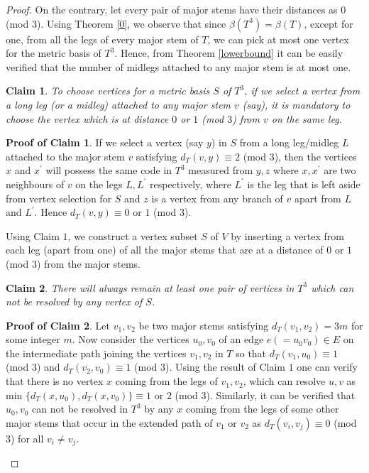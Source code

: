 \documentclass{article}
\theoremstyle{definition}
\numberwithin{equation}{section}
\newtheorem{claim}{Claim}
\newtheorem{claimproof}{Proof of Claim}
\begin{document}
\begin{proof}
On the contrary, let every pair of major stems have their distances as $0$ (mod $3$). Using Theorem \ref{0}, we observe that since $\beta{(T^{3})}=\beta{(T)}$, except for one, from all the legs of every major stem of $T$, we can pick at most one vertex for the metric basis of $T^{3}$.
Hence, from Theorem \ref{lowerbound} it can be easily verified that the number of midlegs attached to any major stem is at most one.

\vspace{0.3em}
\begin{claim}
\textit{To choose vertices for a metric basis $S$ of $T^{3}$, if we select a vertex from a long leg (or a midleg)  attached to any major stem $v$ (say), it is mandatory to choose the vertex which is at distance $0$ or $1$ (mod $3$) from $v$ on the same leg.} 
\end{claim}
\vspace{0.3em}


\begin{claimproof}
If we select a vertex (say $y$) in $S$ from a long leg/midleg $L$ attached to the major stem $v$ satisfying $d_{T}(v,y)\equiv 2$ (mod $3$), then the vertices $x$ and $x^{\prime}$ will possess the same code in $T^{3}$ measured from $y,z$ where $x,x^{\prime}$ are two neighbours of $v$ on the legs $L, L^{\prime}$ respectively, where $L^{\prime}$ is the leg that is left aside from vertex selection for $S$ and $z$ is a vertex from any branch of $v$ apart from $L$ and $L^{\prime}$. Hence $d_{T}(v,y)\equiv 0$ or $1$ (mod $3$).
\end{claimproof}

Using Claim $1$, we construct a vertex subset $S$ of $V$ by inserting a vertex from each leg (apart from one) of all the major stems that are at a distance of $0$ or $1$ (mod $3$) from the major stems.

\vspace{0.3em}
\begin{claim} \textit{There will always remain at least one pair of vertices in $T^{3}$ which can not be resolved by any vertex of $S$.} 
\end{claim}

\begin{claimproof}
Let $v_{1},v_{2}$ be two major stems satisfying $d_{T}(v_{1},v_{2})=3m$ for some integer $m$. Now consider the vertices $u_{0},v_{0}$ of an edge $e(=u_{0}v_{0})\in E$ on the intermediate path joining the vertices $v_{1},v_{2}$ in $T$ so that $d_{T}(v_{1},u_{0})\equiv 1$ (mod $3$) and $d_{T}(v_{2},v_{0})\equiv 1$ (mod $3$). Using the result of Claim $1$ one can verify that there is no vertex $x$ coming from the legs of $v_{1},v_{2}$, which can resolve $u,v$ as min $\{d_{T}(x,u_{0}), d_{T}(x,v_{0})\}\equiv 1$ or $2$ (mod $3$).
Similarly, it can be verified that $u_{0},v_{0}$ can not be resolved in $T^{3}$ by any $x$ coming from the legs of some other major stems that occur in the extended path of $v_{1}$ or $v_{2}$ as $d_{T}(v_{i},v_{j})\equiv 0$ (mod $3$) for all $v_{i}\neq v_{j}$. 


\end{claimproof}
\end{proof}
\end{document}
